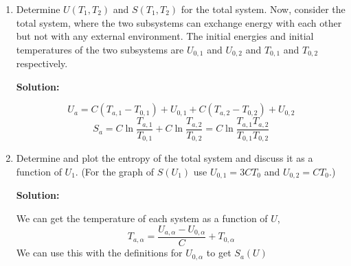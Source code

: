 \documentclass[10pt]{article}
\newenvironment{Solution}
    {\textbf{Solution:}
    
    \vspace{5mm}
    \begin{tcolorbox}
    }
    {
    \end{tcolorbox}
    \vspace{5mm}
    }
\begin{document}
\begin{enumerate}
\begin{enumerate}
\begin{Solution}
\end{Solution}

\item Determine $U\left(T_{1}, T_{2}\right)$ and $S\left(T_{1}, T_{2}\right)$ for the total system.
Now, consider the total system, where the two subsystems can exchange energy with each other but not with any external environment. The initial energies and initial temperatures of the two subsystems are $U_{0, 1}$ and $U_{0, 2}$ and $T_{0, 1}$ and $T_{0, 2}$ respectively.

\begin{Solution}
\begin{equation}
    \boxed{
    U_{a} = C \left(T_{a,1}-T_{0,1}\right)+U_{0,1} + C \left(T_{a,2}-T_{0,2}\right)+U_{0,2}
    }
\end{equation}
\begin{equation}
\boxed{
    S_a = C \ln{\frac{T_{a,1}}{T_{0,1}}} + C \ln{\frac{T_{a,2}}{T_{0,2}}}
    } = \boxed{
    C \ln{\frac{T_{a,1}T_{a,2}}{T_{0,1}T_{0,2}}}}
\end{equation}
\end{Solution}

\item Determine and plot the entropy of the total system and discuss it as a function of $U_{1}$. (For the graph of $S\left(U_{1}\right)$ use $U_{0, 1}=3 C T_{0}$ and $U_{0, 2}=C T_{0}$.)

\begin{Solution}
We can get the temperature of each system as a function of $U$,
\begin{equation}
    T_{a,\alpha} = \frac{U_{a,\alpha} - U_{0,\alpha}}{C}+T_{0,\alpha}
\end{equation}
We can use this with the definitions for $U_{0,\alpha}$ to get $S_a(U)$


\end{Solution}
\end{enumerate}
\end{enumerate}
\end{document}
